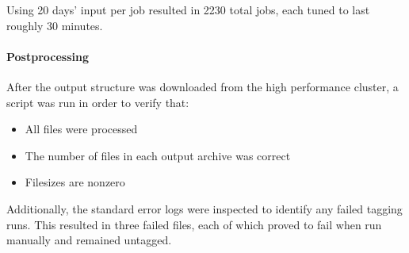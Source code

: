 Using 20 days' input per job resulted in 2230 total jobs, each tuned to last roughly 30 minutes.


\paragraph{Postprocessing}
After the output structure was downloaded from the high performance cluster, a script was run in order to verify that:

\begin{itemize}
    \item All files were processed
    \item The number of files in each output archive was correct
    \item Filesizes are nonzero
\end{itemize}

Additionally, the standard error logs were inspected to identify any failed tagging runs.  This resulted in three failed files, each of which proved to fail when run manually and remained untagged.

